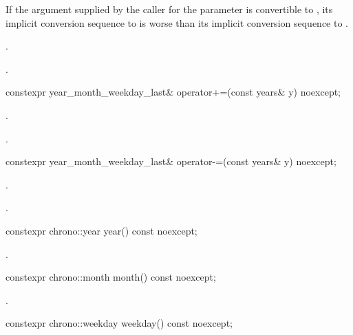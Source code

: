\begin{itemdescr}
\pnum
\constraints
If the argument supplied by the caller for the  parameter
is convertible to ,
its implicit conversion sequence to 
is worse than its implicit conversion sequence to
.

\pnum
\effects
{}.

\pnum
\returns
{}.
\end{itemdescr}

%
\begin{itemdecl}
constexpr year_month_weekday_last& operator+=(const years& y) noexcept;
\end{itemdecl}

\begin{itemdescr}
\pnum
\effects
{}.

\pnum
\returns
{}.
\end{itemdescr}

%
\begin{itemdecl}
constexpr year_month_weekday_last& operator-=(const years& y) noexcept;
\end{itemdecl}

\begin{itemdescr}
\pnum
\effects
{}.

\pnum
\returns
{}.
\end{itemdescr}

%
\begin{itemdecl}
constexpr chrono::year year() const noexcept;
\end{itemdecl}

\begin{itemdescr}
\pnum
\returns
{}.
\end{itemdescr}

%
\begin{itemdecl}
constexpr chrono::month month() const noexcept;
\end{itemdecl}

\begin{itemdescr}
\pnum
\returns
{}.
\end{itemdescr}

%
\begin{itemdecl}
constexpr chrono::weekday weekday() const noexcept;
\end{itemdecl}

